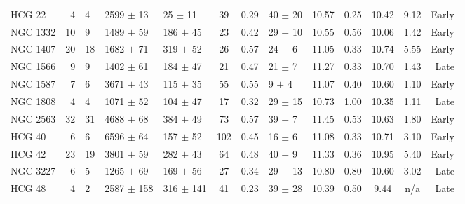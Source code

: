 \begin{table*}
\begin{center}
\begin{tabular}{@{}lr@{\hspace{0.1cm}}lllccl@{\hspace{0.2cm}}ccc@{\hspace{0.2cm}}c@{\hspace{0.2cm}}r@{}}
HCG 22                &  4   &  4                     &  2599 $\pm$ 13   &  25  $\pm$ 11   &  39        &  0.29      &  40   $\pm$ 20  &  10.57          &  0.25  &  10.42          &  9.12   &  Early    \\
NGC 1332              &  10  &  9                     &  1489 $\pm$ 59   &  186 $\pm$ 45   &  23        &  0.42      &  29   $\pm$ 10  &  10.55          &  0.56  &  10.06          &  1.42   &  Early    \\
NGC 1407              &  20  &  18                    &  1682 $\pm$ 71   &  319 $\pm$ 52   &  26        &  0.57      &  24   $\pm$ 6   &  11.05          &  0.33  &  10.74          &  5.55   &  Early    \\
NGC 1566              &  9   &  9                     &  1402 $\pm$ 61   &  184 $\pm$ 47   &  21        &  0.47      &  21   $\pm$ 7   &  11.27          &  0.33  &  10.70          &  1.43   &  Late     \\
NGC 1587              &  7   &  6                     &  3671 $\pm$ 43   &  115 $\pm$ 35   &  55        &  0.55      &  9    $\pm$ 4   &  11.07          &  0.40  &  10.60          &  1.10   &  Early    \\
NGC 1808              &  4   &  4                     &  1071 $\pm$ 52   &  104 $\pm$ 47   &  17        &  0.32      &  29   $\pm$ 15  &  10.73          &  1.00  &  10.35          &  1.11   &  Late     \\
NGC 2563              &  32  &  31                    &  4688 $\pm$ 68   &  384 $\pm$ 49   &  73        &  0.57      &  39   $\pm$ 7   &  11.45          &  0.53  &  10.63          &  1.80   &  Early    \\
HCG 40                &  6   &  6                     &  6596 $\pm$ 64   &  157 $\pm$ 52   &  102       &  0.45      &  16   $\pm$ 6   &  11.08          &  0.33  &  10.71          &  3.10   &  Early    \\
HCG 42                &  23  &  19                    &  3801 $\pm$ 59   &  282 $\pm$ 43   &  64        &  0.48      &  40   $\pm$ 9   &  11.33          &  0.36  &  10.95          &  5.40   &  Early    \\
NGC 3227              &  6   &  5                     &  1265 $\pm$ 69   &  169 $\pm$ 56   &  27        &  0.34      &  29   $\pm$ 13  &  10.80          &  0.80  &  10.60          &  3.02   &  Late     \\
HCG 48                &  4   &  2                     &  2587 $\pm$ 158  &  316 $\pm$ 141  &  41        &  0.23      &  39   $\pm$ 28  &  10.39          &  0.50  &  9.44           &  n/a    &  Late     \\

\end{tabular}
\end{center}
\end{table*}
